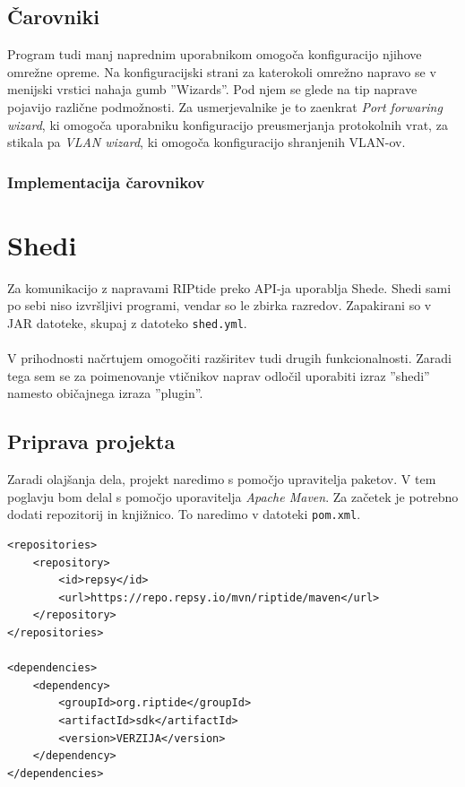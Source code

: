 \documentclass[12pt]{article}
\begin{document}
\subsection{Čarovniki}
Program tudi manj naprednim uporabnikom omogoča konfiguracijo njihove
omrežne opreme. Na konfiguracijski strani za katerokoli omrežno napravo
se v menijski vrstici nahaja gumb ''Wizards''. Pod njem se glede na tip
naprave pojavijo različne podmožnosti. Za usmerjevalnike je to zaenkrat
\textit{Port forwaring wizard}, ki omogoča uporabniku konfiguracijo
preusmerjanja protokolnih vrat, za stikala pa \textit{VLAN wizard},
ki omogoča konfiguracijo shranjenih VLAN-ov.

\subsubsection{Implementacija čarovnikov}

\newpage

\section{Shedi}
Za komunikacijo z napravami RIPtide preko API-ja uporablja Shede. Shedi
sami po sebi niso izvršljivi programi, vendar so le zbirka razredov.
Zapakirani so v JAR datoteke, skupaj z datoteko \texttt{shed.yml}.
\\\\
V prihodnosti načrtujem omogočiti razširitev tudi drugih funkcionalnosti.
Zaradi tega sem se za poimenovanje vtičnikov naprav odločil uporabiti
izraz ''shedi'' namesto običajnega izraza ''plugin''.

\subsection{Priprava projekta}
Zaradi olajšanja dela, projekt naredimo s pomočjo upravitelja paketov. V
tem poglavju bom delal s pomočjo uporavitelja \textit{Apache Maven}. Za
začetek je potrebno dodati repozitorij in knjižnico. To naredimo v datoteki
\texttt{pom.xml}.

\begin{lstlisting}[style=XmlStyle]
<repositories>
	<repository>
		<id>repsy</id>
		<url>https://repo.repsy.io/mvn/riptide/maven</url>
	</repository>
</repositories>

<dependencies>
	<dependency>
		<groupId>org.riptide</groupId>
		<artifactId>sdk</artifactId>
		<version>VERZIJA</version>
	</dependency>
</dependencies>
\end{lstlisting}
\newpage
\end{document}

